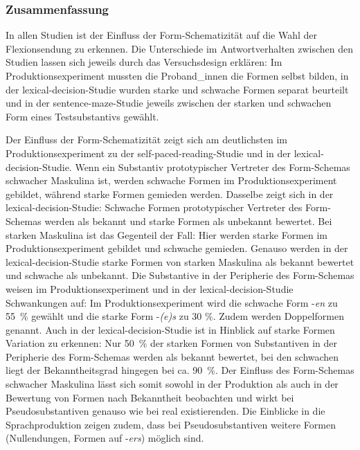 \subsubsection{Zusammenfassung}

In allen Studien ist der Einfluss der Form-Schematizität auf die Wahl der Flexionsendung zu erkennen. Die Unterschiede im Antwortverhalten zwischen den Studien lassen sich jeweils durch das Versuchsdesign erklären: Im Produktionsexperiment mussten die Proband\_innen die Formen selbst bilden, in der lexical-decision-Studie wurden starke und schwache Formen separat beurteilt und in der sentence-maze-Studie jeweils zwischen der starken und schwachen Form eines Testsubstantivs gewählt.


Der Einfluss der Form-Schematizität zeigt sich am deutlichsten im Produktionsexperiment zu der self-paced-reading-Studie und in der lexical-decision-Stu\-die. Wenn ein Substantiv prototypischer Vertreter des Form-Schemas schwacher Maskulina ist, werden schwache Formen im Produktionsexperiment gebildet, während starke Formen gemieden werden. Dasselbe zeigt sich in der lexical-decision-Studie: Schwache Formen prototypischer Vertreter des Form-Sche\-mas werden als bekannt und starke Formen als unbekannt bewertet. Bei starken Maskulina ist das Gegenteil der Fall: Hier werden starke Formen im Produktionsexperiment gebildet und schwache gemieden. Genauso werden in der lexical-decision-Studie starke Formen von starken Maskulina als bekannt bewertet und schwache als unbekannt. Die Substantive in der Peripherie des Form-Schemas weisen im Produktionsexperiment und in der lexical-decision-Studie Schwankungen auf: Im Produktionsexperiment wird die schwache Form -\textit{en} zu 55~\% gewählt und die starke Form -\textit{(e)s} zu 30 \%. Zudem werden Doppelformen genannt. Auch in der lexical-decision-Studie ist in Hinblick auf starke Formen Variation zu erkennen: Nur  50~\% der starken Formen von Substantiven in der Peripherie des Form-Schemas werden als bekannt bewertet, bei den schwachen liegt der Bekanntheitsgrad hingegen bei ca. 90~\%. Der Einfluss des Form-Schemas schwacher Maskulina lässt sich somit sowohl in der Produktion als auch in der Bewertung von Formen nach Bekanntheit beobachten und wirkt bei Pseudosubstantiven genauso wie bei real existierenden. Die Einblicke in die Sprachproduktion zeigen zudem, dass bei Pseudosubstantiven weitere Formen (Nullendungen, Formen auf -\textit{ers}) möglich sind.

 

